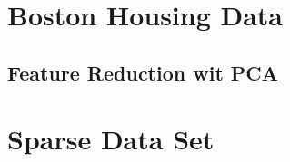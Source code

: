 \section{Boston Housing Data}\label{sec:Boston Housing Data}

\subsection{Feature Reduction wit PCA}\label{sec:Feature Reduction wit PCA}

\section{Sparse Data Set}\label{sec:Spare Data Set}





